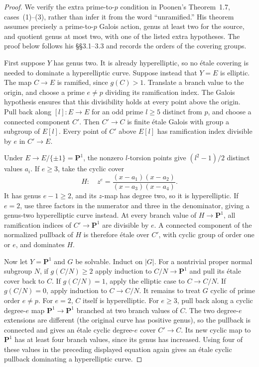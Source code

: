 \documentclass[11pt,a4paper]{article}
\begin{document}
\begin{proof}
We verify the extra prime-to-$p$ condition in Poonen's
Theorem~1.7, cases~(1)--(3), rather than infer it from the word
``unramified.'' His theorem assumes precisely a prime-to-$p$
Galois action, genus at least two for the source, and quotient
genus at most two, with one of the listed extra hypotheses.
The proof below follows his \S\S3.1--3.3 and records the orders
of the covering groups.\citep[Theorem~1.7 and \S3]{LA_Poonen2005}

First suppose $Y$ has genus two. It is already hyperelliptic,
so no \'etale covering is needed to dominate a hyperelliptic curve.
Suppose instead that $Y=E$ is elliptic. The map $C\to E$ is
ramified, since $g(C)>1$. Translate a branch value to the origin,
and choose a prime $e\ne p$ dividing its ramification index.
The Galois hypothesis ensures that this divisibility holds at
every point above the origin. Pull back along $[l]:E\to E$ for
an odd prime $l\ge5$ distinct from $p$, and choose a connected
component $C'$. Then $C'\to C$ is finite \'etale Galois with
group a subgroup of $E[l]$. Every point of $C'$ above $E[l]$
has ramification index divisible by $e$ in $C'\to E$.

Under $E\to E/\{\pm1\}=\mathbf P^1$, the nonzero $l$-torsion
points give $(l^2-1)/2$ distinct values $a_i$. If $e\ge3$, take
the cyclic cover
\[
 H:\quad z^e=\frac{(x-a_1)(x-a_2)}{(x-a_3)(x-a_4)}.
\]
It has genus $e-1\ge2$, and its $z$-map has degree two, so it
is hyperelliptic. If $e=2$, use three factors in the numerator
and three in the denominator, giving a genus-two hyperelliptic
curve instead. At every branch value of $H\to\mathbf P^1$,
all ramification indices of $C'\to\mathbf P^1$ are divisible
by $e$. A connected component of the normalized pullback of
$H$ is therefore \'etale over $C'$, with cyclic group of order
one or $e$, and dominates $H$.

Now let $Y=\mathbf P^1$ and $G$ be solvable. Induct on $|G|$.
For a nontrivial proper normal subgroup $N$, if $g(C/N)\ge2$
apply induction to $C/N\to\mathbf P^1$ and pull its \'etale
cover back to $C$. If $g(C/N)=1$, apply the elliptic case to
$C\to C/N$. If $g(C/N)=0$, apply induction to $C\to C/N$.
It remains to treat $G$ cyclic of prime order $e\ne p$.
For $e=2$, $C$ itself is hyperelliptic. For $e\ge3$, pull
back along a cyclic degree-$e$ map $\mathbf P^1\to\mathbf P^1$
branched at two branch values of $C$. The two degree-$e$
extensions are different (the original curve has positive genus),
so the pullback is connected and gives an \'etale cyclic
degree-$e$ cover $C'\to C$. Its new cyclic map to $\mathbf P^1$
has at least four branch values, since its genus has increased.
Using four of these values in the preceding displayed equation
again gives an \'etale cyclic pullback dominating a hyperelliptic
curve.


\end{proof}
\end{document}
